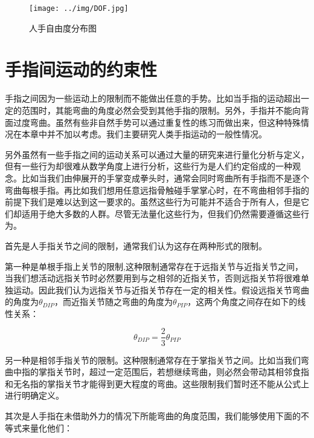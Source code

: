 \begin{figure}[htb]
\centering
\texttt{[image: ../img/DOF.jpg]}
\caption{人手自由度分布图}
\label{fig：graph}
\end{figure}


\section{手指间运动的约束性}

手指之间因为一些运动上的限制而不能做出任意的手势。比如当手指的运动超出一定的范围时，其能弯曲的角度必然会受到其他手指的限制。另外，手指并不能向背面过度弯曲。虽然有些非自然手势可以通过重复性的练习而做出来，但这种特殊情况在本章中并不加以考虑。我们主要研究人类手指运动的一般性情况。

另外虽然有一些手指之间的运动关系可以通过大量的研究来进行量化分析与定义，但有一些行为却很难从数学角度上进行分析，这些行为是人们约定俗成的一种观念。比如当我们由伸展开的手掌变成拳头时，通常会同时弯曲所有手指而不是逐个弯曲每根手指。再比如我们想用任意远指骨触碰手掌掌心时，在不弯曲相邻手指的前提下我们是难以达到这一要求的。虽然这些行为可能并不适合于所有人，但是它们却适用于绝大多数的人群。尽管无法量化这些行为，但我们仍然需要遵循这些行为。

首先是人手指关节之间的限制，通常我们认为这存在两种形式的限制。

第一种是单根手指上关节的限制\cite{Beifang05},这种限制通常存在于远指关节与近指关节之间，当我们想活动远指关节时必然要用到与之相邻的近指关节，否则远指关节将很难单独运动。因此我们认为远指关节与近指关节存在一定的相关性。假设远指关节弯曲的角度为$\theta_{DIP}$，而近指关节随之弯曲的角度为$\theta_{PIP}$，这两个角度之间存在如下的线性关系：

\begin{equation}
  \theta_{DIP}=\frac{2}{3}\theta_{PIP}
\end{equation}

另一种是相邻手指关节的限制。这种限制通常存在于掌指关节之间。比如当我们弯曲中指的掌指关节时，超过一定范围后，若想继续弯曲，则必然会带动其相邻食指和无名指的掌指关节才能得到更大程度的弯曲。这些限制我们暂时还不能从公式上进行明确定义。

其次是人手指在未借助外力的情况下所能弯曲的角度范围，我们能够使用下面的不等式来量化他们\cite{John00}：

